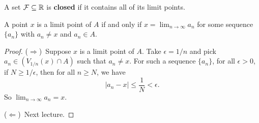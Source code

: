 \begin{definition}
  A set $\mathcal{F} \subseteq \mathbb{R}$ is \textbf{closed}
  if it contains all of its limit points.
\end{definition}

\begin{theorem}
  A point $x$ is a limit point of $A$ if and only
  if $x = \lim_{n \to \infty} a_n$ for some
  sequence $\{a_n\}$ with $a_n \ne x$ and $a_n \in A$.
\end{theorem}

\begin{proof}
  ($\Rightarrow$)\, Suppose $x$ is a limit point of $A$.
  Take $\epsilon = 1 / n$ and pick
  $a_n \in (V_{1 / n}(x) \cap A)$ such that $a_n \ne x$.
  For such a sequence $\{a_n\}$, for all $\epsilon > 0$,
  if $N \ge 1 / \epsilon$, then for all $n \ge N$,
  we have
  \[|a_n - x| \le \frac{1}{N} < \epsilon.\]
  So $\lim_{n \to \infty} a_n = x$.

  ($\Leftarrow$)\, Next lecture.
\end{proof}
